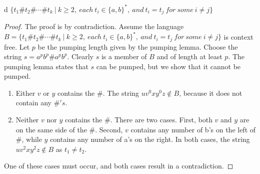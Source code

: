 \documentclass[11pt]{article}
\begin{document}
\begin{problem}[Part]{d}
$\{ t_{1} \# t_{2} \# \cdots \# t_{k} \ | \ k \geq 2, \ each \ t_{i} \in \{a, b\}^{*}, \ and \ t_{i} = t_{j} \ for \ some \ i \neq  j \}$
\end{problem}

\begin{proof}
The proof is by contradiction. Assume the language $B = \{ t_{1} \# t_{2} \# \cdots \# t_{k} \ | \ k \geq 2, \ each \ t_{i} \in \{a, b\}^{*}, \ and \ t_{i} = t_{j} \ for \ some \ i \neq  j \}$ is context free. Let $p$ be the pumping length given by the pumping lemma. Choose the string $s = a^pb^p\#a^pb^p$. Clearly $s$ is a member of $B$ and of length at least $p$. The pumping lemma states that $s$ can be pumped, but we show that it cannot be pumped.

\begin{enumerate}
\item Either $v$ or $y$ contains the $\#$. The string $uv^0xy^0z \notin B$, because it does not contain any $\#'s$.
\item Neither $v$ nor $y$ contains the $\#$. There are two cases. First, both $v$ and $y$ are on the same side of the $\#$. Second, $v$ contains any number of b's on the left of $\#$, while $y$ contains any number of a's on the right. In both cases, the string $uv^2xy^2z \notin B$ as $t_1 \neq t_2$. 
\end{enumerate}
One of these cases must occur, and both cases result in a contradiction.
\end{proof}
\end{document}
